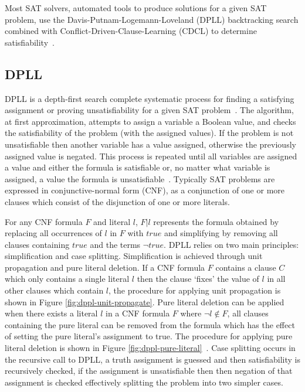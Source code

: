 \documentclass[]{final_report}
\begin{document}
Most SAT solvers, automated tools to produce solutions for a given SAT problem, use the Davis-Putnam-Logemann-Loveland (DPLL) backtracking search combined with Conflict-Driven-Clause-Learning (CDCL) to determine satisfiability~\cite{zhang2001efficient, gomes2008satisfiability}.

\subsection{DPLL}
DPLL is a depth-first search complete systematic process for finding a satisfying assignment or proving unsatisfiability for a given SAT problem~\cite{Davis:1962:MPT:368273.368557}. The algorithm, at first approximation, attempts to assign a variable a Boolean value, and checks the satisfiability of the problem (with the assigned values). If the problem is not unsatisfiable then another variable has a value assigned, otherwise the previously assigned value is negated. This process is repeated until all variables are assigned a value and either the formula is satisfiable or, no matter what variable is assigned, a value the formula is unsatisfiable~\cite{sattosmt}. Typically SAT problems are expressed in conjunctive-normal form (CNF), as a conjunction of one or more clauses which consist of the disjunction of one or more literals. 

For any CNF formula $F$ and literal $l$, $\mathit{F}|l$ represents the formula obtained by replacing all occurrences of $l$ in $F$ with $true$ and simplifying by removing all clauses containing $true$ and the terms $\lnot{true}$. DPLL relies on two main principles: simplification and case splitting. Simplification is achieved through unit propagation and pure literal deletion. If a CNF formula $\mathit{F}$ contains a clause $C$ which only contains a single literal $l$ then the clause `fixes' the value of $l$ in all other clauses which contain $l$, the procedure for applying unit propagation is shown in Figure \ref{fig:dppl-unit-propagate}. Pure literal deletion can be applied when there exists a literal $l$ in a CNF formula $\mathit{F}$ where $\lnot{l} \notin \mathit{F}$, all clauses containing the pure literal can be removed from the formula which has the effect of setting the pure literal's assignment to true. The procedure for applying pure literal deletion is shown in Figure \ref{fig:dppl-pure-literal}~\cite{dpll-worksheet,dpll-method}. Case splitting occurs in the recursive call to DPLL, a truth assignment is guessed and then satisfiability is recursively checked, if the assignment is unsatisfiable then then negation of that assignment is checked effectively splitting the problem into two simpler cases.
\end{document}
